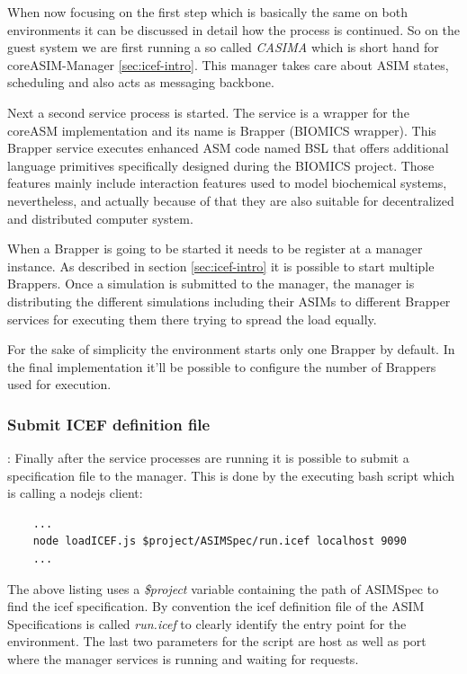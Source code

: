 When now focusing on the first step which is basically the same on both environments it can be discussed in detail how the process is continued. So on the guest system we are first running a so called \textit{CASIMA} which is short hand for coreASIM-Manager \ref{sec:icef-intro}. This manager takes care about ASIM states, scheduling and also acts as messaging backbone.

Next a second service process is started. The service is a wrapper for the coreASM implementation and its name is Brapper (BIOMICS wrapper). This Brapper service executes enhanced ASM code named BSL that offers additional language primitives specifically designed during the BIOMICS project. Those features mainly include interaction features used to model biochemical systems, nevertheless, and actually because of that they are also suitable for decentralized and distributed computer system.

When a Brapper is going to be started it needs to be register at a manager instance. As described in section \ref{sec:icef-intro} it is possible to start multiple Brappers. Once a simulation is submitted to the manager, the manager is distributing the different simulations including their ASIMs to different Brapper services for executing them there trying to spread the load equally.

For the sake of simplicity the environment starts only one Brapper by default. In the final implementation it'll be possible to configure the number of Brappers used for execution.

\subsubsection{Submit ICEF definition file}: Finally after the service processes are running it is possible to submit a specification file to the manager. This is done by the executing bash script which is calling a  nodejs client:

\begin{lstlisting}
	...
	node loadICEF.js $project/ASIMSpec/run.icef localhost 9090
	...
\end{lstlisting}

The above listing uses a \textit{\$project} variable containing the path of ASIMSpec to find the icef specification. By convention the icef definition file of the ASIM Specifications is called \textit{run.icef} to clearly identify the entry point for the environment.
The last two parameters for the script are host as well as port where the manager services is running and waiting for requests.

